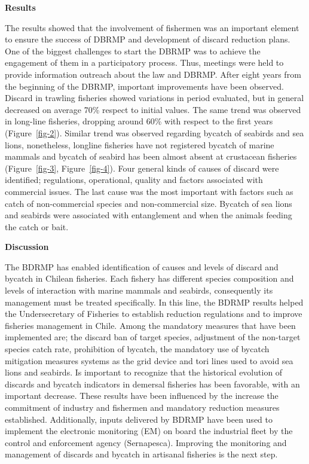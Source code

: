 \documentclass[
  super,
  preprint,
  3p]{elsarticle}
\begin{document}
\textbf{Results}

The results showed that the involvement of fishermen was an important
element to ensure the success of DBRMP and development of discard
reduction plans. One of the biggest challenges to start the DBRMP was to
achieve the engagement of them in a participatory process. Thus,
meetings were held to provide information outreach about the law and
DBRMP. After eight years from the beginning of the DBRMP, important
improvements have been observed. Discard in trawling fisheries showed
variations in period evaluated, but in general decreased on average 70\%
respect to initial values. The same trend was observed in long-line
fisheries, dropping around 60\% with respect to the first years
(Figure~\ref{fig-2}). Similar trend was observed regarding bycatch of
seabirds and sea lions, nonetheless, longline fisheries have not
registered bycatch of marine mammals and bycatch of seabird has been
almost absent at crustacean fisheries (Figure~\ref{fig-3},
Figure~\ref{fig-4}). Four general kinds of causes of discard were
identified; regulations, operational, quality and factors associated
with commercial issues. The last cause was the most important with
factors such as catch of non-commercial species and non-commercial size.
Bycatch of sea lions and seabirds were associated with entanglement and
when the animals feeding the catch or bait.

\textbf{Discussion}

The BDRMP has enabled identification of causes and levels of discard and
bycatch in Chilean fisheries. Each fishery has different species
composition and levels of interaction with marine mammals and seabirds,
consequently its management must be treated specifically. In this line,
the BDRMP results helped the Undersecretary of Fisheries to establish
reduction regulations and to improve fisheries management in Chile.
Among the mandatory measures that have been implemented are; the discard
ban of target species, adjustment of the non-target species catch rate,
prohibition of bycatch, the mandatory use of bycatch mitigation measures
systems as the grid device and tori lines used to avoid sea lions and
seabirds. Is important to recognize that the historical evolution of
discards and bycatch indicators in demersal fisheries has been
favorable, with an important decrease. These results have been
influenced by the increase the commitment of industry and fishermen and
mandatory reduction measures established. Additionally, inputs delivered
by BDRMP have been used to implement the electronic monitoring (EM) on
board the industrial fleet by the control and enforcement agency
(Sernapesca). Improving the monitoring and management of discards and
bycatch in artisanal fisheries is the next step.
\end{document}
